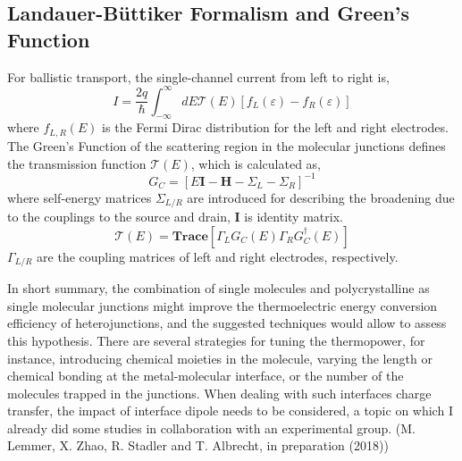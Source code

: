 \documentclass[prb,showpacs,10pt,superscriptaddress]{revtex4-1}
\begin{document}
\subsection{Landauer-B\"{u}ttiker Formalism and Green's Function}
For ballistic transport, the single-channel current from left to right is,
\begin{equation}
I= \dfrac{2q}{\hbar} \int_{-\infty}^{\infty} dE \mathcal{T}(E) [f_{L}(\varepsilon) - f_{R}(\varepsilon)]
\end{equation}
where $f_{L,R}(E)$ is the Fermi Dirac distribution for the left and right electrodes.
The Green's Function of the scattering region in the molecular junctions defines the transmission function $\mathcal{T}(E)$, which is calculated as,
\begin{equation}
G_{C} = [E\textbf{I} - \textbf{H} - \Sigma_{L} - \Sigma_{R}]^{-1}
\end{equation}
where self-energy matrices $\Sigma_{L/R}$ are introduced for describing the broadening due to the couplings to the source and drain, $\textbf{I}$ is identity matrix.
\begin{equation}
\mathcal{T}(E) = \textbf{Trace}[\Gamma_{L} G_{C}(E) \Gamma_{R} G_{C}^\dagger(E)]
\end{equation}
$\Gamma_{L/R}$ are the coupling matrices of left and right electrodes, respectively. 

In short summary, the combination of single molecules and polycrystalline as single molecular junctions might improve the thermoelectric energy conversion efficiency of heterojunctions, and the suggested techniques would allow to assess this hypothesis. There are several strategies for tuning the thermopower, for instance, introducing chemical moieties in the molecule, varying the length or chemical bonding at the metal-molecular interface, or the number of the molecules trapped in the junctions.   
When dealing with such interfaces charge transfer, the impact of interface dipole needs to be considered, a topic on which I already did some studies in collaboration with an experimental group. (M. Lemmer, X. Zhao, R. Stadler and T. Albrecht, in preparation (2018))





\end{document}
